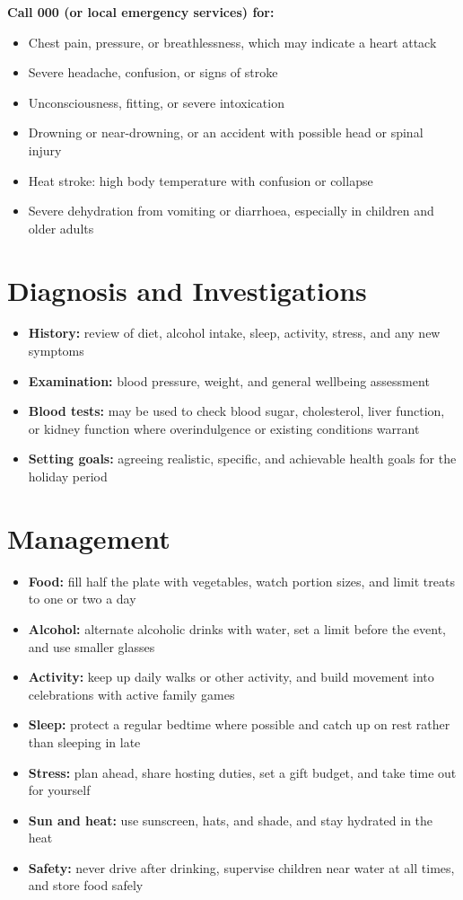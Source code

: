 \textbf{Call 000 (or local emergency services) for:}
\begin{itemize}
    \item Chest pain, pressure, or breathlessness, which may indicate a heart attack
    \item Severe headache, confusion, or signs of stroke
    \item Unconsciousness, fitting, or severe intoxication
    \item Drowning or near-drowning, or an accident with possible head or spinal injury
    \item Heat stroke: high body temperature with confusion or collapse
    \item Severe dehydration from vomiting or diarrhoea, especially in children and older adults
\end{itemize}

\section*{Diagnosis and Investigations}
\begin{itemize}
    \item \textbf{History:} review of diet, alcohol intake, sleep, activity, stress, and any new symptoms
    \item \textbf{Examination:} blood pressure, weight, and general wellbeing assessment
    \item \textbf{Blood tests:} may be used to check blood sugar, cholesterol, liver function, or kidney function where overindulgence or existing conditions warrant
    \item \textbf{Setting goals:} agreeing realistic, specific, and achievable health goals for the holiday period
\end{itemize}

\section*{Management}
\begin{itemize}
    \item \textbf{Food:} fill half the plate with vegetables, watch portion sizes, and limit treats to one or two a day
    \item \textbf{Alcohol:} alternate alcoholic drinks with water, set a limit before the event, and use smaller glasses
    \item \textbf{Activity:} keep up daily walks or other activity, and build movement into celebrations with active family games
    \item \textbf{Sleep:} protect a regular bedtime where possible and catch up on rest rather than sleeping in late
    \item \textbf{Stress:} plan ahead, share hosting duties, set a gift budget, and take time out for yourself
    \item \textbf{Sun and heat:} use sunscreen, hats, and shade, and stay hydrated in the heat
    \item \textbf{Safety:} never drive after drinking, supervise children near water at all times, and store food safely
\end{itemize}

